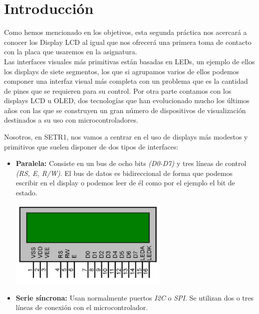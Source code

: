 \documentclass[11pt,a4paper]{article}
\begin{document}
	\section{Introducción}
	\large{
		Como hemos mencionado en los objetivos, esta segunda práctica nos acercará a conocer los Display LCD al igual que nos ofrecerá una primera toma de contacto con la placa que usaremos en la asignatura.\\
		
		Las interfaces visuales más primitivas están basadas en LEDs, un ejemplo de ellos los displays de siete segmentos, los que si agrupamos varios de ellos podemos componer una interfaz visual más completa con un problema que es la cantidad de pines que se requieren para su control. Por otra parte contamos con los displays LCD u OLED, dos tecnologías que han evolucionado mucho los últimos años con las que se construyen un gran número de dispositivos de visualización destinados a su uso con microcontroladores.
		
		Nosotros, en SETR1, nos vamos a centrar en el uso de displays más modestos y primitivos que suelen disponer de dos tipos de interfaces:
		\begin{itemize}
			\item \textbf{Paralela:} Consiste en un bus de ocho bits \textit{(D0-D7)} y tres líneas de control \textit{(RS, E, R/W)}. El bus de datos es bidireccional de forma que podemos escribir en el display o podemos leer de él como por el ejemplo el bit de estado.
			
			\begin{center}
				\includegraphics[width=0.6\textwidth]{pinout-display.png}
			\end{center}
			
			\item \textbf{Serie síncrona:} Usan normalmente puertos \textit{I2C} o \textit{SPI}. Se utilizan dos o tres líneas de conexión con el microcontrolador.
		\end{itemize}
		
}
\end{document}
